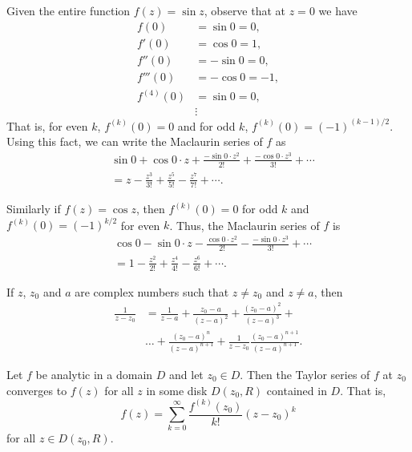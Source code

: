 \begin{example}
    Given the entire function \(f(z) = \sin z\), observe that at \(z = 0\) we
    have
    \begin{align*}
        f(0) &= \sin 0 = 0, \\
        f'(0) &= \cos 0 = 1, \\
        f''(0) &= -\sin 0 = 0, \\
        f'''(0) &= -\cos 0 = -1, \\
        f^{(4)}(0) &= \sin 0 = 0, \\
        &\vdots
    \end{align*}
    That is, for even \(k\), \(f^{(k)}(0) = 0\) and for odd \(k\), \(f^{(k)}(0)
    = (-1)^{(k - 1)/2}\). Using this fact, we can write the Maclaurin series of
    \(f\) as
    \begin{align*}
        &\sin 0 + \cos 0 \cdot z + \frac{-\sin 0 \cdot z^2}{2!} + \frac{-\cos 0 \cdot z^3}{3!} + \cdots \\
        &= z - \frac{z^3}{3!} + \frac{z^5}{5!} - \frac{z^7}{7!} + \cdots.
    \end{align*}

    Similarly if \(f(z) = \cos z\), then \(f^(k)(0) = 0\) for odd \(k\) and \(f^(k)(0) = (-1)^{k/2}\) for even \(k\). Thus, the Maclaurin series of \(f\) is
    \begin{align*}
        &\cos 0 - \sin 0 \cdot z - \frac{\cos 0 \cdot z^2}{2!} - \frac{-\sin 0 \cdot z^3}{3!} + \cdots \\
        &= 1 - \frac{z^2}{2!} + \frac{z^4}{4!} - \frac{z^6}{6!} + \cdots.
    \end{align*}
\end{example}

\begin{theorem}
    If \(z\), \(z_0\) and \(a\) are complex numbers such that \(z \neq z_0\) and \(z \neq a\), then
    \begin{align*}
        \frac{1}{z - z_0} &= \frac{1}{z - a} + \frac{z_0 - a}{(z - a)^2} + \frac{(z_0 - a)^2}{(z - a)^3} + \\
        &\dots + \frac{(z_0 - a)^n}{(z - a)^{n + 1}} + \frac{1}{z-z_0} \frac{(z_0 - a)^{n + 1}}{(z - a)^{n + 1}}.
    \end{align*}
\end{theorem}

\begin{theorem}
    Let \(f\) be analytic in a domain \(D\) and let \(z_0 \in D\). Then the Taylor series of \(f\) at \(z_0\) converges to \(f(z)\) for all \(z\) in some disk \(D(z_0, R)\) contained in \(D\). That is,
    \[
        f(z) = \sum_{k = 0}^\infty \frac{f^{(k)}(z_0)}{k!} (z - z_0)^k
    \]
    for all \(z \in D(z_0, R)\).
\end{theorem}

